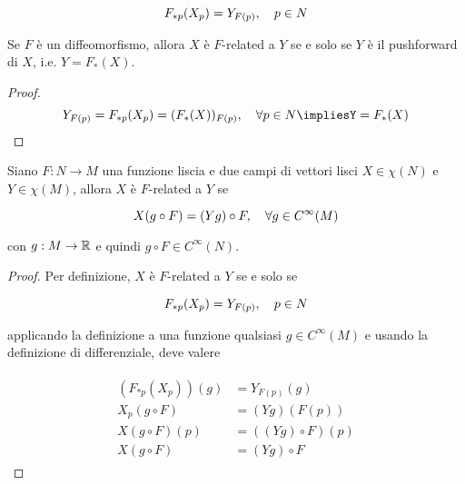 \begin{equation}
	F_{*p}(X_{p}) = Y_{F(p)} \qcomma p \in N
\end{equation}

\begin{remark}
	Se $ F $ è un diffeomorfismo, allora $ X $ è $ F $-related a $ Y $ se e solo se $ Y $ è il pushforward di $ X $, i.e. $ Y = F_{*}(X) $.
\end{remark}

\begin{proof}
	\begin{equation}
		Y_{F(p)} = F_{*p}(X_{p}) = (F_{*}(X))_{F(p)} \qcomma \forall p \in N %
		\implies%
		Y = F_{*}(X)
	\end{equation}
\end{proof}

\begin{theorem}
	Siano $ F : N \to M $ una funzione liscia e due campi di vettori lisci $ X \in \chi(N) $ e $ Y \in \chi(M) $, allora $ X $ è $ F $-related a $ Y $ se
	
	\begin{equation}
		X(g \circ F) = (Y g) \circ F \qcomma \forall g \in C^{\infty}(M)
	\end{equation}

	con $ g : M \to \mathbb{R} $ e quindi $ g \circ F \in C^{\infty}(N) $.
\end{theorem}

\begin{proof}
	Per definizione, $ X $ è $ F $-related a $ Y $ se e solo se
	
	\begin{equation}
		F_{*p}(X_{p}) = Y_{F(p)} \qcomma p \in N
	\end{equation}

	applicando la definizione a una funzione qualsiasi $ g \in C^{\infty}(M) $ e usando la definizione di differenziale, deve valere
	
	\begin{align}
		\begin{split}
			(F_{*p}(X_{p}))(g) &= Y_{F(p)}(g) \\
			X_{p}(g \circ F) &= (Y g)(F(p)) \\
			X(g \circ F)(p) &= ((Y g) \circ F)(p) \\
			X(g \circ F) &= (Y g) \circ F
		\end{split}
	\end{align}
\end{proof}


